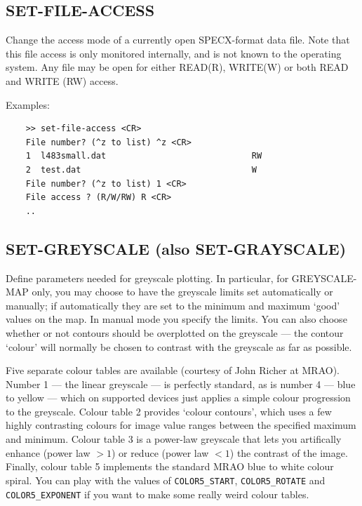 \documentclass[11pt,twoside]{report}
\begin{document}
\subsection{SET-FILE-ACCESS} 

Change the access mode of a currently open SPECX-format data file. Note that
this file access is only monitored internally, and is not known to the operating
system. Any file may be open for either READ(R), WRITE(W) or both READ and
WRITE (RW) access.

Examples:
\begin{verbatim}
    >> set-file-access <CR>
    File number? (^z to list) ^z <CR>
    1  l483small.dat                             RW
    2  test.dat                                  W 
    File number? (^z to list) 1 <CR>
    File access ? (R/W/RW) R <CR>
    ..
\end{verbatim}

\subsection{SET-GREYSCALE (also SET-GRAYSCALE)}

Define parameters needed for greyscale plotting. In particular, for GREYSCALE-MAP
only, you may choose to have the greyscale limits set automatically or manually;
if automatically they are set to the minimum and maximum `good' values on the
map. In manual mode you specify the limits. You can also choose whether or not
contours should be overplotted on the greyscale --- the contour `colour' will
normally be chosen to contrast with the greyscale as far as possible. 

Five separate colour tables are available (courtesy of John Richer at MRAO).
Number 1 --- the linear greyscale --- is perfectly standard, as is number
4 --- blue to yellow --- which on supported devices just applies a simple
colour progression to the greyscale. Colour table 2 provides `colour contours',
which uses a few highly contrasting colours for image value ranges between
the specified maximum and minimum. Colour table 3 is a power-law
greyscale that lets you artifically enhance (power law $>1$) or reduce (power
law $<1$) the contrast of the image. Finally, colour table 5 implements the
standard MRAO blue to white colour spiral. You can play with the values of
\verb+COLOR5_START+, \verb+COLOR5_ROTATE+ and \verb+COLOR5_EXPONENT+ if you
want to make some really weird colour tables.
\end{document}
